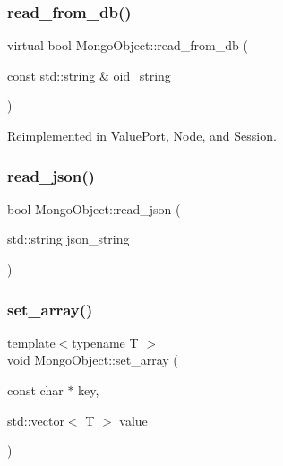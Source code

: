 \mbox{\label{class_mongo_object_a729412e226c9964e13ba80688c3f5e00}} 
\subsubsection{\texorpdfstring{read\+\_\+from\+\_\+db()}{read\_from\_db()}\hspace{0.1cm}{\footnotesize\ttfamily [2/2]}}
{\footnotesize\ttfamily virtual bool Mongo\+Object\+::read\+\_\+from\+\_\+db (\begin{DoxyParamCaption}\item[{const std\+::string \&}]{oid\+\_\+string }\end{DoxyParamCaption})\hspace{0.3cm}{\ttfamily [virtual]}}



Reimplemented in \hyperlink{class_value_port_aacece741e134ac67f447e7e1d0822bca}{Value\+Port}, \hyperlink{class_node_a60c605aced4420d3d6f6fe54b5a5b6bb}{Node}, and \hyperlink{class_session_a4f09644fd155a1d5640cedefe4aa42fc}{Session}.

\mbox{\label{class_mongo_object_adce8ffc4811a9d1c94701711f574bc34}} 
\subsubsection{\texorpdfstring{read\+\_\+json()}{read\_json()}}
{\footnotesize\ttfamily bool Mongo\+Object\+::read\+\_\+json (\begin{DoxyParamCaption}\item[{std\+::string}]{json\+\_\+string }\end{DoxyParamCaption})}

\mbox{\label{class_mongo_object_ac251f38eef739fb9e1418a20e7fcc7f7}} 
\subsubsection{\texorpdfstring{set\+\_\+array()}{set\_array()}}
{\footnotesize\ttfamily template$<$typename T $>$ \\
void Mongo\+Object\+::set\+\_\+array (\begin{DoxyParamCaption}\item[{const char $\ast$}]{key,  }\item[{std\+::vector$<$ T $>$}]{value }\end{DoxyParamCaption})\hspace{0.3cm}{\ttfamily [inline]}}

